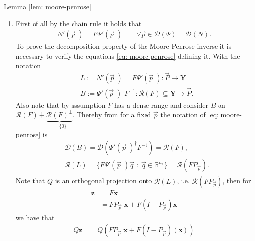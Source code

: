\begin{myproof}{Lemma \ref{lem: moore-penrose}}
    \label{proof: lem-moore-penrose}
    \begin{enumerate}
        \item
            First of all by the chain rule it holds that
            \begin{align}
                N'(\vec{p}\;) = F\Psi'(\vec{p}\;) \qquad
                \forall \vec{p} \in \mathcal{D}(\Psi) = \mathcal{D}(N).
            \end{align}
            To prove the decomposition property of the Moore-Penrose
            inverse it is necessary to verify the equations
            \ref{eq: moore-penrose} defining it. With the notation
            \begin{align}
                &L:= N'(\vec{p}\;) = F\Psi'(\vec{p}\;): \vec{P} \to
                \mathbf{Y} \\
                &B:= \Psi'(\vec{p}\;)^{\dagger}F^{-1} : \mathcal{R}(F)
                \subseteq \mathbf{Y} \to \vec{P}.
            \end{align}
            Also note that by assumption $F$ has a dense range and consider
            $B$ on $\mathcal{R}(F) \dotplus
            \underbrace{\mathcal{R}(F)^{\perp}}_{=\{0\}}$. Thereby from for
            a fixed $\vec{p}$ the notation of \ref{eq: moore-penrose} is
            \begin{align}
                &\mathcal{D}(B) =
                \mathcal{D}(\Psi'(\vec{p}\;)^{\dagger}F^{-1}) =
                \mathcal{R}(F),\\
                &\mathcal{R}(L) = \big\{F\Psi'(\vec{p}\;)\vec{q}\;:\;\vec{q}
                \in \mathbb{R}^{n_*} \big\} = \mathcal{R}(FP_{\vec{p}}).
            \end{align}
            Note that $Q$ is an orthogonal projection onto
            $\overline{\mathcal{R}(L)}$, i.e.
            $\overline{\mathcal{R}(FP_{\vec{p}})}$, then for
            \begin{align}
                \mathbf{z} &= F\mathbf{x} \\
                    &= FP_{\vec{p}}\;
                    \mathbf{x} + F\left(I-P_{\vec{p}} \right) \mathbf{x}
            \end{align}
            we have that
            \begin{align}
                Q\mathbf{z} &= Q\left(FP_{\vec{p}}\;\mathbf{x}
                   + F(I-P_{\vec{p}})(\mathbf{x})\right) \\

\end{align}
\end{enumerate}
\end{myproof}
